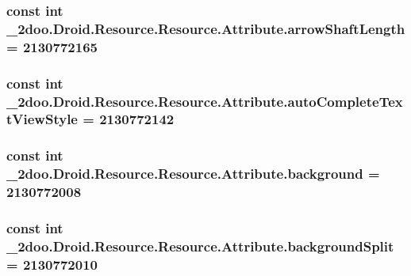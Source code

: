 \hypertarget{class__2doo_1_1_droid_1_1_resource_1_1_attribute_58567e826986c3db975085229cfc26a7}{
\subsubsection[{arrowShaftLength}]{\setlength{\rightskip}{0pt plus 5cm}const int \_\-2doo.Droid.Resource.Resource.Attribute.arrowShaftLength = 2130772165}}
\label{class__2doo_1_1_droid_1_1_resource_1_1_attribute_58567e826986c3db975085229cfc26a7}


\hypertarget{class__2doo_1_1_droid_1_1_resource_1_1_attribute_5f0eb5488cc15818f22a1013e6ffd748}{
\subsubsection[{autoCompleteTextViewStyle}]{\setlength{\rightskip}{0pt plus 5cm}const int \_\-2doo.Droid.Resource.Resource.Attribute.autoCompleteTextViewStyle = 2130772142}}
\label{class__2doo_1_1_droid_1_1_resource_1_1_attribute_5f0eb5488cc15818f22a1013e6ffd748}


\hypertarget{class__2doo_1_1_droid_1_1_resource_1_1_attribute_074c95131bdf9c467e533004578c702a}{
\subsubsection[{background}]{\setlength{\rightskip}{0pt plus 5cm}const int \_\-2doo.Droid.Resource.Resource.Attribute.background = 2130772008}}
\label{class__2doo_1_1_droid_1_1_resource_1_1_attribute_074c95131bdf9c467e533004578c702a}


\hypertarget{class__2doo_1_1_droid_1_1_resource_1_1_attribute_4a83c34579a9f842a8e731b8a01b814d}{
\subsubsection[{backgroundSplit}]{\setlength{\rightskip}{0pt plus 5cm}const int \_\-2doo.Droid.Resource.Resource.Attribute.backgroundSplit = 2130772010}}
\label{class__2doo_1_1_droid_1_1_resource_1_1_attribute_4a83c34579a9f842a8e731b8a01b814d}


